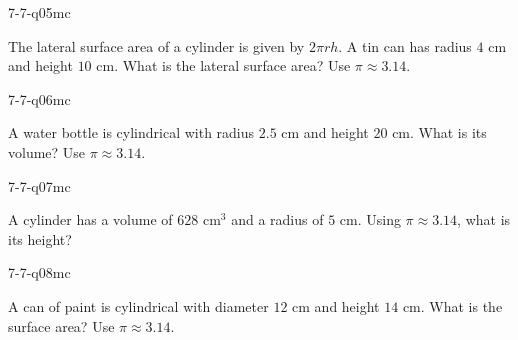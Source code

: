 \begin{practiceQuestion}{7-7-q05}{mc}
\begin{questionText}
The lateral surface area of a cylinder is given by $2\pi rh$. A tin can has radius $4$ cm and height $10$ cm. What is the lateral surface area? Use $\pi \approx 3.14$.
\end{questionText}
\end{practiceQuestion}

\begin{practiceQuestion}{7-7-q06}{mc}
\begin{questionText}
A water bottle is cylindrical with radius $2.5$ cm and height $20$ cm. What is its volume? Use $\pi \approx 3.14$.
\end{questionText}
\end{practiceQuestion}

\begin{practiceQuestion}{7-7-q07}{mc}
\begin{questionText}
A cylinder has a volume of $628$ cm$^3$ and a radius of $5$ cm. Using $\pi \approx 3.14$, what is its height?
\end{questionText}
\end{practiceQuestion}

\begin{practiceQuestion}{7-7-q08}{mc}
\begin{questionText}
A can of paint is cylindrical with diameter $12$ cm and height $14$ cm. What is the surface area? Use $\pi \approx 3.14$.
\end{questionText}
\end{practiceQuestion}


